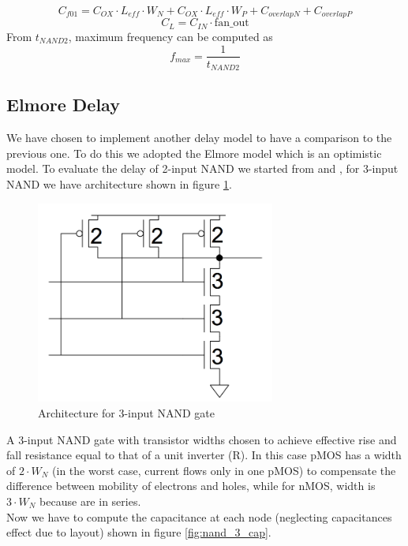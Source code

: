 \begin{equation}
C_{f01} = C_{OX}\cdotp L_{eff}\cdotp W_N + C_{OX}\cdotp L_{eff}\cdotp W_P + C_{overlapN} + C_{overlapP}
\end{equation}
\begin{equation}
C_L = C_{IN}\cdotp \text{fan\_out}
\end{equation}
From $t_{NAND2}$, maximum frequency can be computed as
\begin{equation}
f_{max}=\frac{1}{t_{NAND2}}
\end{equation}

\subsection{Elmore Delay}
We have chosen to implement another delay model to have a comparison to the previous one. To do this we adopted the Elmore model which is an optimistic model. To evaluate the delay of 2-input NAND we started from \cite{elmore_example1} and \cite{elmore_example2}, for 3-input NAND we have architecture shown in figure \ref{fig:nand_3}.
\begin{figure}[htbp]
\begin{center}
\includegraphics[width=0.7\textwidth]{img/nand_3.jpg}
\caption{Architecture for 3-input NAND gate}
\label{fig:nand_3}
\end{center}
\end{figure}
A 3-input NAND gate with transistor widths chosen to achieve effective rise and fall resistance equal to that of a unit inverter (R). In this case pMOS has a width of $2\cdotp W_N$ (in the worst case, current flows only in one pMOS) to compensate the difference between mobility of electrons and holes, while for nMOS, width is $3\cdotp W_N$ because are in series. \\Now we have to compute the capacitance at each node (neglecting capacitances effect due to layout) shown in figure \ref{fig:nand_3_cap}.
